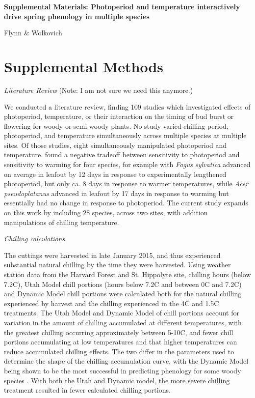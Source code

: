 \documentclass{article}
\begin{document}
\noindent \textbf{\large{Supplemental Materials: Photoperiod and temperature interactively drive spring phenology in multiple species}}

\noindent Flynn \& Wolkovich
\renewcommand{\thetable}{S\arabic{table}}
\renewcommand{\thefigure}{S\arabic{figure}}

\section*{Supplemental Methods}
\noindent\emph{Literature Review} (Note: I am not sure we need this anymore.)

\noindent We conducted a literature review, finding 109 studies which investigated effects of photoperiod, temperature, or their interaction on the timing of bud burst or flowering for woody or semi-woody plants.  No study varied chilling period, photoperiod, and temperature simultaneously across multiple species at multiple sites. Of those studies, eight simultaneously manipulated photoperiod and temperature. \citet{Basler:2014aa} found a negative tradeoff between sensitivity to photoperiod and sensitivity to warming for four species, for example with \emph{Fagus sylvatica} advanced on average in leafout by 12 days in response to experimentally lengthened photoperiod, but only ca. 8 days in response to warmer temperatures, while \emph{Acer pseudoplatanus} advanced in leafout by 17 days in response to warming but essentially had no change in response to photoperiod. The current study expands on this work by including 28 species, across two sites, with addition manipulations of chilling temperature.

\noindent\emph{Chilling calculations}

\noindent The cuttings were harvested in late January 2015, and thus experienced substantial natural chilling by the time they were harvested. Using weather station data from the Harvard Forest and St. Hippolyte site, chilling hours (below 7.2\degree C), Utah Model chill portions (hours below 7.2\degree C and between 0\degree C and 7.2\degree C) and Dynamic Model \citep{Erez:1988} chill portions were calculated both for the natural chilling experienced by harvest and the chilling experienced in the 4\degree C and 1.5\degree C treatments. The Utah Model and Dynamic Model of chill portions account for variation in the amount of chilling accumulated at different temperatures, with the greatest chilling occurring approximately between 5-10\degree C, and fewer chill portions accumulating at low temperatures and that higher temperatures can reduce accumulated chilling effects. The two differ in the parameters used to determine the shape of the chilling accumulation curve, with the Dynamic Model being shown to be the most successful in predicting phenology for some woody species \citep{Luedeling:2009}.
With both the Utah and Dynamic model, the more severe chilling treatment resulted in fewer calculated chilling portions. 
\end{document}
